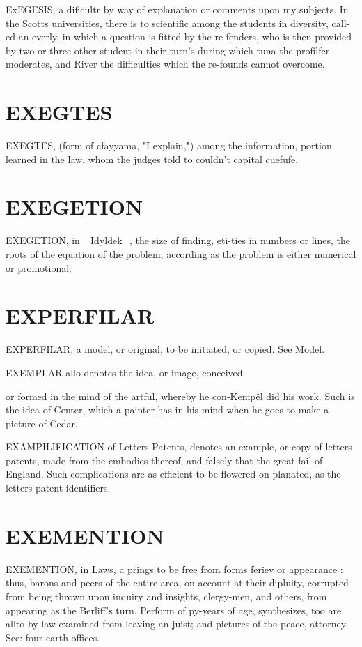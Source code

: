 \documentclass{article}
\begin{document}
ExEGESIS, a dificultr by way of explanation or comments upon my subjects. In the Scotts universities, there is to scientific among the students in diversity, call-ed an everly, in which a question is fitted by the re-fenders, who is then provided by two or three other student in their turn's during which tuna the profilfer moderates, and River the difficulties which the re-founds cannot overcome.

\section*{EXEGTES}
EXEGTES, (form of cfayyama, "I explain,") among the information, portion learned in the law, whom the judges told to couldn’t capital cuefufe.

\section*{EXEGETION}
EXEGETION, in \_Idyldek\_, the size of finding, eti-ties in numbers or lines, the roots of the equation of the problem, according as the problem is either numerical or promotional.

\section*{EXPERFILAR}
EXPERFILAR, a model, or original, to be initiated, or copied. See Model.

EXEMPLAR allo denotes the idea, or image, conceived

or formed in the mind of the artful, whereby he con-Kempêl did his work. Such is the idea of Center, which a painter has in his mind when he goes to make a picture of Cedar.

EXAMPILIFICATION of Letters Patents, denotes an example, or copy of letters patents, made from the embodies thereof, and falsely that the great fail of England. Such complications are as efficient to be flowered on planated, as the letters patent identifiers.

\section*{EXEMENTION}
EXEMENTION, in Laws, a prings to be free from forms feriev or appearance : thus, barons and peers of the entire area, on account at their dipluity, corrupted from being thrown upon inquiry and insights, clergy-men, and others, from appearing as the Berliff's turn. Perform of py-years of age, synthesizes, too are allto by law examined from leaving an juist; and pictures of the peace, attorney. See: four earth offices.
\end{document}
